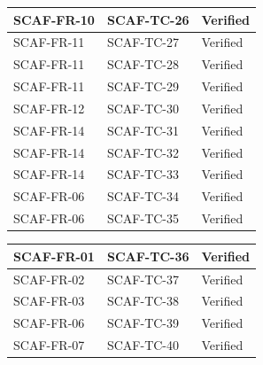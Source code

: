 \documentclass{report}
\begin{document}
\begin{tabularx}{\textwidth}{ 
  |p{}%
  |p{}%
  |p{}|%
}
  SCAF-FR-10 & SCAF-TC-26 & Verified \\
  \hline
  SCAF-FR-11 & SCAF-TC-27 & Verified \\
  \hline
  SCAF-FR-11 & SCAF-TC-28 & Verified \\
  \hline
  SCAF-FR-11 & SCAF-TC-29 & Verified \\
  \hline
  SCAF-FR-12 & SCAF-TC-30 & Verified \\
  \hline
  SCAF-FR-14 & SCAF-TC-31 & Verified \\
  \hline
  SCAF-FR-14 & SCAF-TC-32 & Verified \\
  \hline
  SCAF-FR-14 & SCAF-TC-33 & Verified \\
  \hline
  SCAF-FR-06 & SCAF-TC-34 & Verified \\
  \hline
  SCAF-FR-06 & SCAF-TC-35 & Verified \\
  \hline
\end{tabularx}
\newpage
\begin{tabularx}{\textwidth}{ 
  |p{}%
  |p{}%
  |p{}|%
}
  \hline
  SCAF-FR-01 & SCAF-TC-36 & Verified \\
  \hline
  SCAF-FR-02 & SCAF-TC-37 & Verified \\
  \hline
  SCAF-FR-03 & SCAF-TC-38 & Verified \\
  \hline
  SCAF-FR-06 & SCAF-TC-39 & Verified \\
  \hline
  SCAF-FR-07 & SCAF-TC-40 & Verified \\
  \hline
\end{tabularx}
\end{document}
